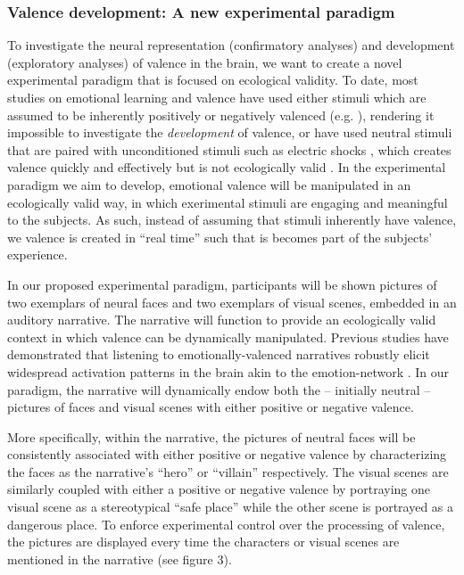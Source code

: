 \documentclass[12pt,a4paper]{article}\usepackage[]{graphicx}\usepackage[]{color}
\begin{document}
\subsubsection{Valence development: A new experimental paradigm}
To investigate the neural representation (confirmatory analyses) and development (exploratory analyses) of valence in the brain, we want to create a novel experimental paradigm that is focused on ecological validity. To date, most studies on emotional learning and valence have used either stimuli which are assumed to be inherently positively or negatively valenced (e.g. \citealp{baucom2012,aldhafeeri2012}), rendering it impossible to investigate the \emph{development} of valence, or have used neutral stimuli that are paired with unconditioned stimuli such as electric shocks \citep{visser2013}, which creates valence quickly and effectively but is not ecologically valid \citep{spiers2007}. In the experimental paradigm we aim to develop, emotional valence will be manipulated in an ecologically valid way, in which exerimental stimuli are engaging and meaningful to the subjects. As such, instead of assuming that stimuli inherently have valence, we valence is created in ``real time'' such that is becomes part of the subjects' experience.  

In our proposed experimental paradigm, participants will be shown pictures of two exemplars of neural faces and two exemplars of visual scenes, embedded in an auditory narrative. The narrative will function to provide an ecologically valid context in which valence can be dynamically manipulated. Previous studies have demonstrated that listening to emotionally-valenced narratives robustly elicit widespread activation patterns in the brain \citep{nijhof2015,mar2011} akin to the emotion-network \citep{sabatinelli2006}. In our paradigm, the narrative will dynamically endow both the -- initially neutral -- pictures of faces and visual scenes with either positive or negative valence. 

More specifically, within the narrative, the pictures of neutral faces will be consistently associated with either positive or negative valence by characterizing the faces as the narrative's ``hero'' or ``villain'' respectively. The visual scenes are similarly coupled with either a positive or negative valence by portraying one visual scene as a stereotypical ``safe place'' while the other scene is portrayed as a dangerous place. To enforce experimental control over the processing of valence, the pictures are displayed every time the characters or visual scenes are mentioned in the narrative (see figure 3).
\end{document}
